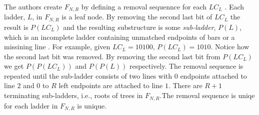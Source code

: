 The authors create $F_{N,R}$ by defining a removal sequennce for 
each $LC_{L}$ \cite{A6}. Each ladder, $L$, in 
$F_{N,R}$ is a leaf node. By removing the second last bit of $LC_{L}$ the result 
is $P(LC_{L})$ and the resulting substructure is some \emph{sub-ladder}, $P(L)$, which 
is an incomplete ladder containing unmatched endpoints of bars or a missining line \cite{A6}. For example, 
given $LC_{L}=10100$, $P(LC_{L})=1010$. Notice how the second last bit was removed. 
By removing the second last bit from $P(LC_{L})$ we get $P(P(LC_{L}))$ and $P(P(L))$ respectively.
The removal sequence is repeated until the sub-ladder consists of two lines with $0$ endpoints
attached to line $2$ and $0$ to $R$ left endpoints are attached to line $1$. There are $R+1$
terminating sub-ladders, i.e., roots of trees in $F_{N, R}$.The removal sequence is uniqe for each ladder in $F_{N,R}$ is unique.\par
